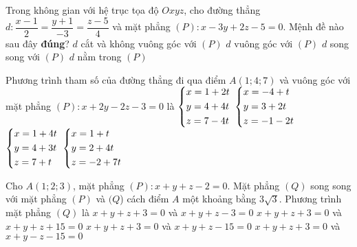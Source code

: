 \begin{ex}%
	Trong không gian với hệ trục tọa độ $Oxyz$, cho đường thẳng $d\colon \dfrac{x-1}{2}=\dfrac{y+1}{-3}=\dfrac{z-5}{4}$ và mặt phẳng $(P)\colon x-3y+2z-5=0$. Mệnh đề nào sau đây \textbf{đúng}?
	\choice
	{\True $d$ cắt và không vuông góc với $(P)$}
	{$d$ vuông góc với $(P)$}
	{$d$ song song với $(P)$}
	{$d$ nằm trong $(P)$}
\end{ex}
\begin{ex}%
	Phương trình tham số của đường thẳng đi qua điểm $A\left(1;4;7\right)$ và vuông góc với mặt phẳng $(P)\colon x+2y-2z-3=0$ là
	\choice
	{\True $\left\{\begin{aligned}
			& x=1+2t \\ 
			& y=4+4t \\ 
			& z=7-4t\end{aligned}\right.$}
	{$\left\{\begin{aligned}
			& x=-4+t \\ 
			& y=3+2t \\ 
			& z=-1-2t\end{aligned}\right.$}
	{$\left\{\begin{aligned}
			& x=1+4t \\ 
			& y=4+3t \\ 
			& z=7+t\end{aligned}\right.$}
	{$\left\{\begin{aligned}
			& x=1+t \\ 
			& y=2+4t \\ 
			& z=-2+7t\end{aligned}\right.$}
\end{ex}
\begin{ex}%
	Cho $A\left(1;2;3\right)$, mặt phẳng $(P)\colon x+y+z-2=0$. Mặt phẳng $(Q)$ song song với mặt phẳng $(P)$ và $(Q$) cách điểm $A$ một khoảng bằng $3\sqrt{3}$. Phương trình mặt phẳng $(Q)$ là
	\choice
	{$x+y+z+3=0$ và $x+y+z-3=0$}
	{$x+y+z+3=0$ và $x+y+z+15=0$}
	{\True $x+y+z+3=0$ và $x+y+z-15=0$}
	{$x+y+z+3=0$ và $x+y-z-15=0$}
\end{ex}
